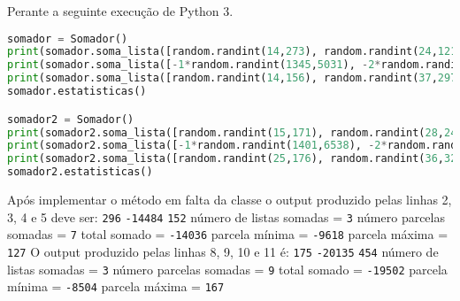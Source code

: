 \documentclass[37pt,varwidth=16cm,border=17pt]{standalone}
\begin{document}
Perante a seguinte execução de Python 3. 

\begin{lstlisting}[language=Python]
somador = Somador()
print(somador.soma_lista([random.randint(14,273), random.randint(24,121), random.randint(24,140)]))
print(somador.soma_lista([-1*random.randint(1345,5031), -2*random.randint(1189, 6392)]))
print(somador.soma_lista([random.randint(14,156), random.randint(37,297)]))
somador.estatisticas()

somador2 = Somador()
print(somador2.soma_lista([random.randint(15,171), random.randint(28,248)]))
print(somador2.soma_lista([-1*random.randint(1401,6538), -2*random.randint(1691, 5503), -3*random.randint(1283,7453)]))
print(somador2.soma_lista([random.randint(25,176), random.randint(36,329), random.randint(7,159), random.randint(5,313)]))
somador2.estatisticas()
\end{lstlisting}


Após implementar o método em falta da classe o output produzido pelas linhas 2, 3, 4 e 5 deve ser:
\newline 
\verb+296+\newline
\verb+-14484+\newline
\verb+152+\newline
número de listas somadas = \verb+3+\newline
número parcelas somadas  = \verb+7+\newline
total somado             = \verb+-14036+\newline
parcela mínima           = \verb+-9618+\newline
parcela máxima           = \verb+127+\newline
\newline
\newline
O output produzido pelas linhas 8, 9, 10 e 11 é:
\newline
\verb+175+\newline
\verb+-20135+\newline
\verb+454+\newline
número de listas somadas = \verb+3+\newline
número parcelas somadas  = \verb+9+\newline
total somado             = \verb+-19502+\newline
parcela mínima           = \verb+-8504+\newline
parcela máxima           = \verb+167+\newline
\end{document}
